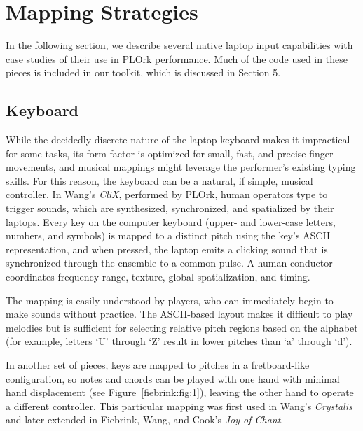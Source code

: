 \section{Mapping Strategies}
In the following section, we describe several native laptop input capabilities
with case studies of their use in PLOrk performance. Much of the code used in
these pieces is included in our toolkit, which is discussed in Section 5.

\subsection{Keyboard}
While the decidedly discrete nature of the laptop keyboard makes it impractical
for some tasks, its form factor is optimized for small, fast, and precise finger
movements, and musical mappings might leverage the performer's existing typing
skills. For this reason, the keyboard can be a natural, if simple, musical
controller. In Wang's \textit{CliX}, performed by PLOrk, human operators type to
trigger sounds, which are synthesized, synchronized, and spatialized by their
laptops. Every key on the computer keyboard (upper- and lower-case letters,
numbers, and symbols) is mapped to a distinct pitch using the key's ASCII
representation, and when pressed, the laptop emits a clicking sound that is
synchronized through the ensemble to a common pulse. A human conductor
coordinates frequency range, texture, global spatialization, and timing.

The mapping is easily understood by players, who can immediately begin to make
sounds without practice. The ASCII-based layout makes it difficult to play
melodies but is sufficient for selecting relative pitch regions based on the
alphabet (for example, letters `U' through `Z' result in lower pitches than `a'
through `d').

In another set of pieces, keys are mapped to pitches in a fretboard-like
configuration, so notes and chords can be played with one hand with minimal hand
displacement (see Figure~\ref{fiebrink:fig:1}), leaving the other hand to operate a different
controller. This particular mapping was first used in Wang's \textit{Crystalis}
and later extended in Fiebrink, Wang, and Cook's \textit{Joy of Chant}.

